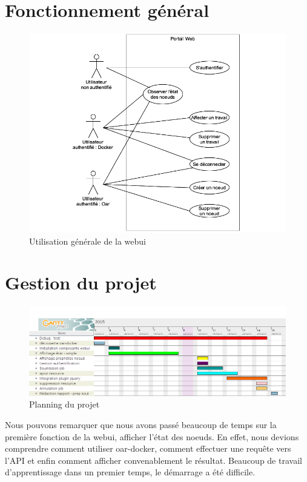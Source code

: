 \documentclass[a4paper,10pt]{article}
\begin{document}
\section{Fonctionnement général}
\begin{figure}[h]
  \begin{center}
    \includegraphics[scale=0.5]{./usr.png}
   \caption{\label{usr} Utilisation générale de la webui}
  \end{center}
\end{figure}

\section{Gestion du projet}
\begin{figure}[h]
  \begin{center}
    \includegraphics[scale=0.45]{./oardocker-planning.png}
   \caption{\label{oardocker-planning} Planning du projet}
  \end{center}
\end{figure}

Nous pouvons remarquer que nous avons passé beaucoup de temps sur la première fonction de la webui, afficher l'état des noeuds.
En effet, nous devions comprendre comment utiliser oar-docker, comment effectuer une requête vers l'API et enfin comment afficher convenablement le résultat.
Beaucoup de travail d'apprentissage dans un premier temps, le démarrage a été difficile.
\newpage
\end{document}

